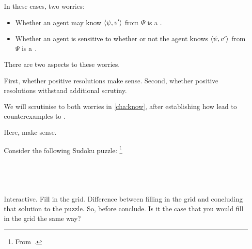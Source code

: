 \begin{note}
  In these cases, two worries:

  \begin{itemize}
  \item
    Whether an agent may know \(\langle \psi, v' \rangle\) from \(\Psi\) is a \fc{}.
  \item
    Whether an agent is sensitive to whether or not the agent knows \(\langle \psi, v' \rangle\) from \(\Psi\) is a \fc{}.
  \end{itemize}

  There are two aspects to these worries.

  First, whether positive resolutions make sense.
  Second, whether positive resolutions withstand additional scrutiny.

  We will scrutinise to both worries in \autoref{cha:know}, after establishing how  lead to counterexamples to \issueConstraint{}.

  Here, make sense.
\end{note}

\begin{note}
  \begin{illustration}[Sudoku]
    \label{illu:gist:sudoku}
    Consider the following Sudoku puzzle:%
    \footnote{
      From~\textcite[84]{Coussement:2007up}.
    }
    \vspace{\baselineskip}

    \mbox{ }\hfill%
    \begin{adjustbox}{minipage=0.45\linewidth,scale=1}
      \centering
    \end{adjustbox}%
    \hfill\mbox{ }
  \end{illustration}

  Interactive.
  Fill in the grid.
  Difference between filling in the grid and concluding that solution to the puzzle.
  So, before conclude.
  Is it the case that you would fill in the grid the same way?
\end{note}

